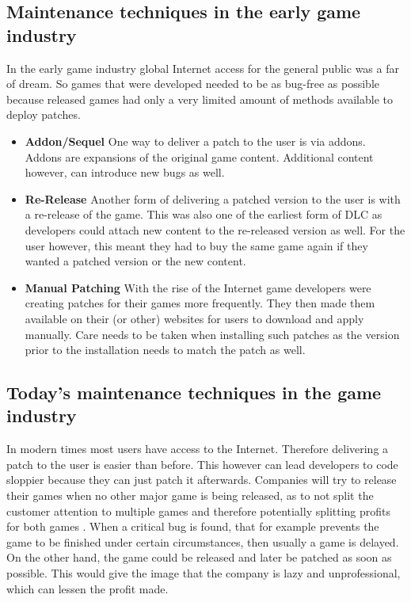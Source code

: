 \subsection{Maintenance techniques in the early game industry}
\label{subsec:techniquesEarlyGameIndustry}
In the early game industry global Internet access for the general public was a far of dream. So games that were developed needed to be as bug-free as possible because released games had only a very limited amount of methods available to deploy patches.\citep{jarman_testing_2010}
\begin{itemize}
    \item \textbf{Addon/Sequel}\newline
    One way to deliver a patch to the user is via addons. Addons are expansions of the original game content. Additional content however, can introduce new bugs as well.\citep{jarman_testing_2010}
    \item \textbf{Re-Release}\newline
    Another form of delivering a patched version to the user is with a re-release of the game. This was also one of the earliest form of DLC as developers could attach new content to the re-released version as well. For the user however, this meant they had to buy the same game again if they wanted a patched version or the new content. \citep{jarman_testing_2010}
    \item \textbf{Manual Patching}\newline
    With the rise of the Internet game developers were creating patches for their games more frequently. They then made them available on their (or other) websites for users to download and apply manually. Care needs to be taken when installing such patches as the version prior to the installation needs to match the patch as well.\citep{jarman_testing_2010}
\end{itemize}

\subsection{Today's maintenance techniques in the game industry}
\label{subsec:techniquesTodaysGameIndustry}
In modern times most users have access to the Internet. Therefore delivering a patch to the user is easier than before.
This however can lead developers to code sloppier because they can just patch it afterwards\citep{jarman_testing_2010}. Companies will try to release their games when no other major game is being released, as to not split the customer attention to multiple games and therefore potentially splitting profits for both games \citep{jarman_testing_2010}. When a critical bug is found, that for example prevents the game to be finished under certain circumstances, then usually a game is delayed. On the other hand, the game could be released and later be patched as soon as possible. This would give the image that the company is lazy and unprofessional, which can lessen the profit made\citep{jarman_testing_2010}.

